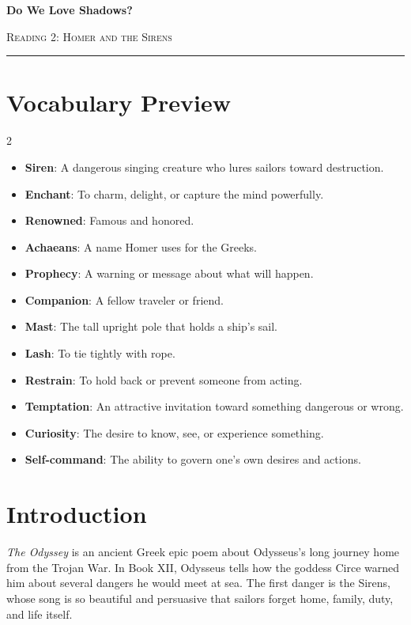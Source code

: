 \documentclass[12pt]{article}
\begin{document}
\begin{center}
{\LARGE\bfseries Do We Love Shadows?}\par\vspace{0.25em}
{\large\scshape Reading 2: Homer and the Sirens}\par\vspace{0.45em}
\rule{0.82\textwidth}{0.4pt}\par\vspace{0.7em}
\end{center}

\section*{Vocabulary Preview}
\begin{multicols}{2}
\begin{itemize}[leftmargin=*, itemsep=0.18em]
\item \textbf{Siren}: A dangerous singing creature who lures sailors toward destruction.
\item \textbf{Enchant}: To charm, delight, or capture the mind powerfully.
\item \textbf{Renowned}: Famous and honored.
\item \textbf{Achaeans}: A name Homer uses for the Greeks.
\item \textbf{Prophecy}: A warning or message about what will happen.
\item \textbf{Companion}: A fellow traveler or friend.
\item \textbf{Mast}: The tall upright pole that holds a ship's sail.
\item \textbf{Lash}: To tie tightly with rope.
\item \textbf{Restrain}: To hold back or prevent someone from acting.
\item \textbf{Temptation}: An attractive invitation toward something dangerous or wrong.
\item \textbf{Curiosity}: The desire to know, see, or experience something.
\item \textbf{Self-command}: The ability to govern one's own desires and actions.
\end{itemize}
\end{multicols}

\section*{Introduction}
\textit{The Odyssey} is an ancient Greek epic poem about Odysseus's long journey home from the Trojan War. In Book XII, Odysseus tells how the goddess Circe warned him about several dangers he would meet at sea. The first danger is the Sirens, whose song is so beautiful and persuasive that sailors forget home, family, duty, and life itself.
\end{document}

